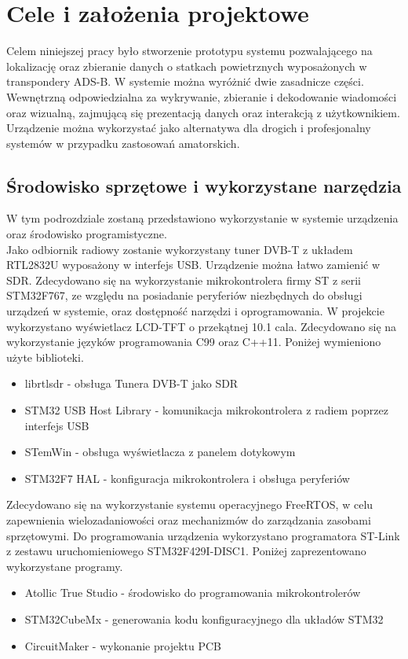 \documentclass[eng,printmode]{mgr}
\begin{document}
\chapter{ Cele i założenia projektowe }
Celem niniejszej pracy było stworzenie prototypu systemu pozwalającego na lokalizację oraz zbieranie danych o statkach powietrznych wyposażonych w transpondery ADS-B. W systemie można wyróżnić dwie zasadnicze części.
Wewnętrzną odpowiedzialna za wykrywanie, zbieranie i dekodowanie wiadomości oraz wizualną, zajmującą się prezentacją danych oraz interakcją z użytkownikiem. Urządzenie można wykorzystać jako alternatywa dla drogich i profesjonalny systemów w przypadku zastosowań amatorskich.

\section{Środowisko sprzętowe i wykorzystane narzędzia}
W tym podrozdziale zostaną przedstawiono wykorzystanie w systemie urządzenia oraz środowisko programistyczne.
\\


Jako odbiornik radiowy zostanie wykorzystany tuner DVB-T z układem RTL2832U wyposażony w interfejs USB. Urządzenie można łatwo zamienić w SDR. Zdecydowano się na wykorzystanie mikrokontrolera firmy ST z serii STM32F767, ze względu na posiadanie peryferiów niezbędnych do obsługi urządzeń w systemie, oraz dostępność narzędzi i oprogramowania. W projekcie wykorzystano wyświetlacz LCD-TFT o przekątnej 10.1 cala.
Zdecydowano się na wykorzystanie języków programowania C99 oraz C++11.
Poniżej wymieniono użyte biblioteki.
\begin{itemize}
  \item librtlsdr - obsługa Tunera DVB-T jako SDR
  \item STM32 USB Host Library - komunikacja mikrokontrolera z radiem poprzez interfejs USB
  \item STemWin - obsługa wyświetlacza z panelem dotykowym
  \item STM32F7 HAL - konfiguracja mikrokontrolera i obsługa peryferiów
\end{itemize}


Zdecydowano się na wykorzystanie systemu operacyjnego FreeRTOS, w celu zapewnienia wielozadaniowości oraz mechanizmów do zarządzania zasobami sprzętowymi. Do programowania urządzenia wykorzystano programatora ST-Link z zestawu uruchomieniowego STM32F429I-DISC1. Poniżej zaprezentowano wykorzystane programy.

\begin{itemize}
  \item Atollic True Studio - środowisko do programowania mikrokontrolerów
  \item STM32CubeMx - generowania kodu konfiguracyjnego dla układów STM32
  \item CircuitMaker - wykonanie projektu PCB
\end{itemize}
\end{document}

